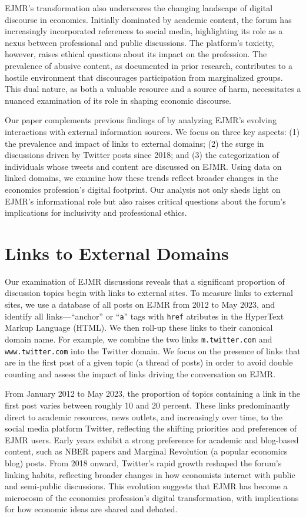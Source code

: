 \documentclass[PP]{AEA}
\begin{document}
EJMR's transformation also underscores the changing landscape of digital discourse in economics. Initially dominated by academic content, the forum has increasingly incorporated references to social media, highlighting its role as a nexus between professional and public discussions. The platform's toxicity, however, raises ethical questions about its impact on the profession. The prevalence of abusive content, as documented in prior research, contributes to a hostile environment that discourages participation from marginalized groups. This dual nature, as both a valuable resource and a source of harm, necessitates a nuanced examination of its role in shaping economic discourse.

Our paper complements previous findings of \cite{ederer2024anonymity} by analyzing EJMR's evolving interactions with external information sources. We focus on three key aspects: (1) the prevalence and impact of links to external domains; (2) the surge in discussions driven by Twitter posts since 2018; and (3) the categorization of individuals whose tweets and content are discussed on EJMR. Using data on linked domains, we examine how these trends reflect broader changes in the economics profession's digital footprint. Our analysis not only sheds light on EJMR's informational role but also raises critical questions about the forum's implications for inclusivity and professional ethics.

\section{Links to External Domains}

Our examination of EJMR discussions reveals that a significant proportion of discussion topics begin with links to external sites. To measure links to external sites, we use a database of all posts on EJMR from 2012 to May 2023, and identify all links---``anchor'' or ``\texttt{a}'' tags with \texttt{href} atributes in the HyperText Markup Language (HTML). We then roll-up these links to their canonical domain name. For example, we combine the two links \texttt{m.twitter.com} and \texttt{www.twitter.com} into the Twitter domain. We focus on the presence of links that are in the first post of a given topic (a thread of posts) in order to avoid double counting and assess the impact of links driving the conversation on EJMR.

From January 2012 to May 2023, the proportion of topics containing a link in the first post varies between roughly 10 and 20 percent. These links predominantly direct to academic resources, news outlets, and increasingly over time, to the social media platform Twitter, reflecting the shifting priorities and preferences of EJMR users. Early years exhibit a strong preference for academic and blog-based content, such as NBER papers and Marginal Revolution (a popular economics blog) posts. From 2018 onward, Twitter's rapid growth reshaped the forum's linking habits, reflecting broader changes in how economists interact with public and semi-public discussions. This evolution suggests that EJMR has become a microcosm of the economics profession's digital transformation, with implications for how economic ideas are shared and debated.
\end{document}
